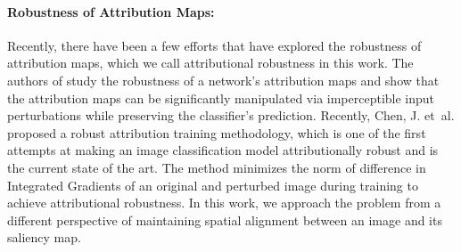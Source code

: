 \documentclass[runningheads]{llncs}
\def\etal{et~al.}
\begin{document}
\paragraph{\textbf{Robustness of Attribution Maps:}}
Recently, there have been a few efforts \cite{sal_fire,aaai_sal,nips_sal,robust_attr_nips_sal,alvarez2018robustness} that have explored the robustness of attribution maps, which we call attributional robustness in this work. The authors of \cite{aaai_sal,nips_sal,sal_fire} study the robustness of a network's attribution maps and show that the attribution maps can be significantly manipulated via imperceptible input perturbations while preserving the classifier's prediction. Recently, Chen, J. \etal \cite{robust_attr_nips_sal} proposed a robust attribution training methodology, which is one of the first attempts at making an image classification model attributionally robust and is the current state of the art. The method minimizes the norm of difference in Integrated Gradients \cite{attr2017integrated} of an original and perturbed image during training to achieve attributional robustness. In this work, we approach the problem from a different perspective of maintaining spatial alignment between an image and its saliency map. 
\end{document}
